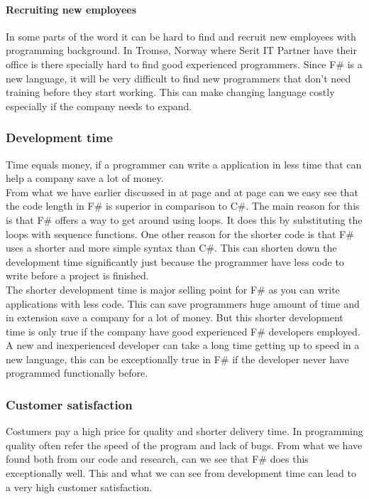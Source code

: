 \documentclass[12pt, a4paper]{article}
\begin{document}
\paragraph{Recruiting new employees}
In some parts of the word it can be hard to find and recruit new employees with programming background. In Tromsø, Norway where Serit IT Partner have their office is there specially hard to find good experienced programmers. Since F\# is a new language, it will be very difficult to find new programmers that don't need training before they start working. This can make changing language costly especially if the company needs to expand.

\newpage
\subsubsection{Development time}
Time equals money, if a programmer can write a application in less time that can help a company save a lot of money.\\ 

From what we have earlier discussed in  at page \pageref{linesOfCode} and  at page \pageref{Testimonials} can we easy see that the code length in F\# is superior in comparison to C\#. The main reason for this is that F\# offers a way to get around using loops. It does this by substituting the loops with sequence functions. One other reason for the shorter code is that F\# uses a shorter and more simple syntax than C\#. This can shorten down the development time significantly just because the programmer have less code to write before a project is finished.\\ 

The shorter development time is major selling point for F\# as you can write applications with less code. This can save programmers huge amount of time and in extension save a company for a lot of money. But this shorter development time is only true if the company have good experienced F\# developers employed. A new and inexperienced developer can take a long time getting up to speed in a new language, this can be exceptionally true in F\# if the developer never have programmed functionally before.   

\newpage
\subsubsection{Customer satisfaction}
Costumers pay a high price for quality and shorter delivery time. In programming quality often refer the speed of the program and lack of bugs. From what we have found both from our code and research, can we see that F\# does this exceptionally well. This and what we can see from development time can lead to a very high customer satisfaction.
\end{document}
